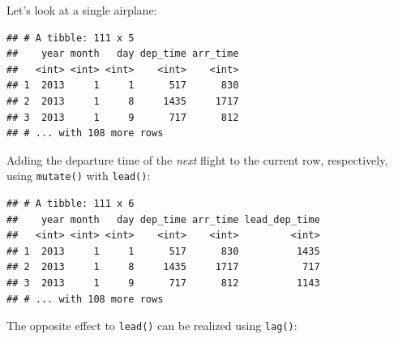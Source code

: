 \documentclass[]{book}
\newenvironment{Shaded}{}{}
\newcommand{\DataTypeTok}[1]{#1}
\newcommand{\KeywordTok}[1]{\textcolor[rgb]{0.00,0.00,1.00}{#1}}
\newcommand{\NormalTok}[1]{#1}
\newcommand{\OperatorTok}[1]{#1}
\newcommand{\StringTok}[1]{\textcolor[rgb]{0.00,0.50,0.50}{#1}}
\begin{document}
Let's look at a single airplane:

\begin{Shaded}
\end{Shaded}

\begin{verbatim}
## # A tibble: 111 x 5
##    year month   day dep_time arr_time
##   <int> <int> <int>    <int>    <int>
## 1  2013     1     1      517      830
## 2  2013     1     8     1435     1717
## 3  2013     1     9      717      812
## # ... with 108 more rows
\end{verbatim}

Adding the departure time of the \emph{next} flight to the current row, respectively, using \texttt{mutate()} with \texttt{lead()}:

\begin{Shaded}
\end{Shaded}

\begin{verbatim}
## # A tibble: 111 x 6
##    year month   day dep_time arr_time lead_dep_time
##   <int> <int> <int>    <int>    <int>         <int>
## 1  2013     1     1      517      830          1435
## 2  2013     1     8     1435     1717           717
## 3  2013     1     9      717      812          1143
## # ... with 108 more rows
\end{verbatim}

The opposite effect to \texttt{lead()} can be realized using \texttt{lag()}:

\begin{Shaded}
\end{Shaded}
\end{document}

